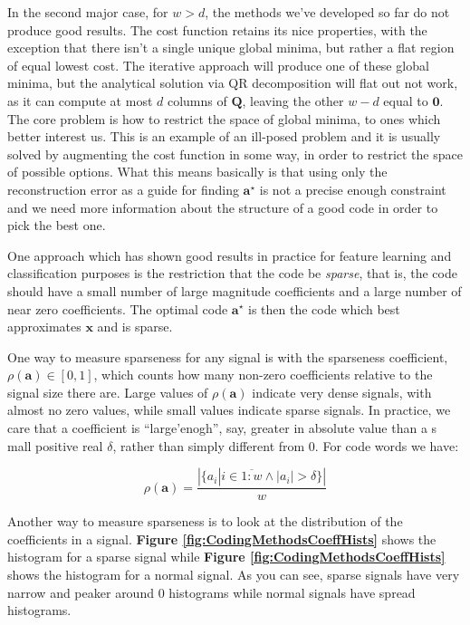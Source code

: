 \documentclass[12pt,a4paper,oneside,english]{UPBThesis}
\newcommand{\hcrange}[2]{\overline{{#1}\colon\!\!{#2}}}
\begin{document}
In the second major case, for $w > d$, the methods we've developed so far do not produce good results. The cost function retains its nice properties, with the exception that there isn't a single unique global minima, but rather a flat region of equal lowest cost. The iterative approach will produce one of these global minima, but the analytical solution via QR decomposition will flat out not work, as it can compute at most $d$ columns of $\textbf{Q}$, leaving the other $w - d$ equal to $\textbf{0}$. The core problem is how to restrict the space of global minima, to ones which better interest us. This is an example of an ill-posed problem and it is usually solved by augmenting the cost function in some way, in order to restrict the space of possible options. What this means basically is that using only the reconstruction error as a guide for finding $\textbf{a}^\star$ is not a precise enough constraint and we need more information about the structure of a good code in order to pick the best one.

One approach which has shown good results in practice for feature learning \cite{emergence-sparse-coding,sparse-coding-strategy-V1} and classification purposes \cite{sparse-features-audio-classification,importance-encoding-sparse-coding-vq,simple-method-sparse-coding} is the restriction that the code be \emph{sparse}, that is, the code should have a small number of large magnitude coefficients and a large number of near zero coefficients. The optimal code $\textbf{a}^\star$ is then the code which best approximates $\textbf{x}$ and is sparse.

One way to measure sparseness for any signal is with the sparseness coefficient, $\rho(\textbf{a}) \in [0,1]$, which counts how many non-zero coefficients relative to the signal size there are. Large values of $\rho(\textbf{a})$ indicate very dense signals, with almost no zero values, while small values indicate sparse signals. In practice, we care that a coefficient is ``large'enogh'', say, greater in absolute value than a s mall positive real $\delta$, rather than simply different from $0$. For code words we have:

\begin{equation*}
\rho(\textbf{a}) = \frac{\left| \{ a_i \left|\right. i \in \hcrange{1}{w} \wedge \left|a_i\right| > \delta \} \right|}{w}
\end{equation*}

Another way to measure sparseness is to look at the distribution of the coefficients in a signal. \textbf{Figure \ref{fig:CodingMethodsCoeffHists}} shows the histogram for a sparse signal while \textbf{Figure \ref{fig:CodingMethodsCoeffHists}} shows the histogram for a normal signal. As you can see, sparse signals have very narrow and peaker around $0$ histograms while normal signals have spread histograms.
\end{document}
